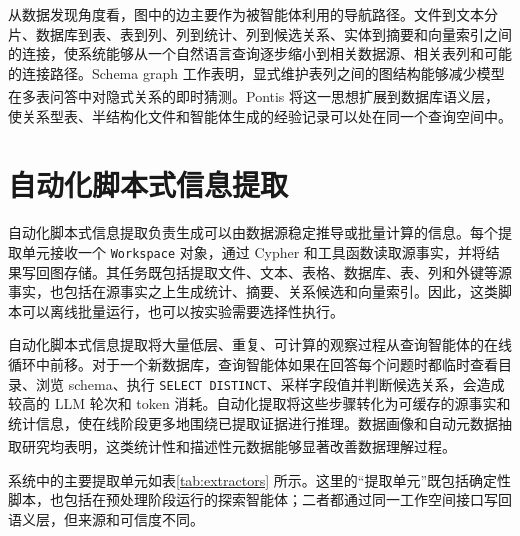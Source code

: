 \documentclass[
    bachelor,
    pdflinks,
]{xjtuthesis}
\newcommand{\upcite}[1]{\textsuperscript{\cite{#1}}}
\begin{document}
从数据发现角度看，图中的边主要作为被智能体利用的导航路径。文件到文本分片、数据库到表、表到列、列到统计、列到候选关系、实体到摘要和向量索引之间的连接，使系统能够从一个自然语言查询逐步缩小到相关数据源、相关表列和可能的连接路径。Schema graph 工作表明，显式维护表列之间的图结构能够减少模型在多表问答中对隐式关系的即时猜测\upcite{wang2025schemaGraphQA}。Pontis 将这一思想扩展到数据库语义层，使关系型表、半结构化文件和智能体生成的经验记录可以处在同一个查询空间中。


\section{自动化脚本式信息提取}

自动化脚本式信息提取负责生成可以由数据源稳定推导或批量计算的信息。每个提取单元接收一个 \texttt{Workspace} 对象，通过 Cypher 和工具函数读取源事实，并将结果写回图存储。其任务既包括提取文件、文本、表格、数据库、表、列和外键等源事实，也包括在源事实之上生成统计、摘要、关系候选和向量索引。因此，这类脚本可以离线批量运行，也可以按实验需要选择性执行。

自动化脚本式信息提取将大量低层、重复、可计算的观察过程从查询智能体的在线循环中前移。对于一个新数据库，查询智能体如果在回答每个问题时都临时查看目录、浏览 schema、执行 \texttt{SELECT DISTINCT}、采样字段值并判断候选关系，会造成较高的 LLM 轮次和 token 消耗。自动化提取将这些步骤转化为可缓存的源事实和统计信息，使在线阶段更多地围绕已提取证据进行推理。数据画像和自动元数据抽取研究均表明，这类统计性和描述性元数据能够显著改善数据理解过程\upcite{abedjan2015profiling,shkapenyuk2025metadata}。

系统中的主要提取单元如表\ref{tab:extractors} 所示。这里的“提取单元”既包括确定性脚本，也包括在预处理阶段运行的探索智能体；二者都通过同一工作空间接口写回语义层，但来源和可信度不同。
\end{document}

